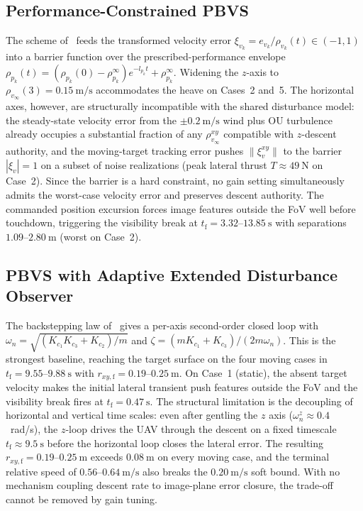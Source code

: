 \documentclass{IEEEtaes}
\begin{document}
\subsection{Performance-Constrained PBVS \cite{lin2022}}
The scheme of~\cite{lin2022} feeds the transformed velocity error $\xi_{v_k}=e_{v_k}/\rho_{v_k}(t)\in(-1,1)$ into a barrier function over the prescribed-performance envelope $\rho_{p_k}(t)=(\rho_{p_k}(0)-\rho_{p_k}^\infty)e^{-l_{p_k}t}+\rho_{p_k}^\infty$. Widening the $z$-axis to $\rho_{v_\infty}(3)=0.15~\text{m/s}$ accommodates the heave on Cases~2 and~5. The horizontal axes, however, are structurally incompatible with the shared disturbance model: the steady-state velocity error from the $\pm 0.2~\text{m/s}$ wind plus OU turbulence already occupies a substantial fraction of any $\rho_{v_\infty}^{xy}$ compatible with $z$-descent authority, and the moving-target tracking error pushes $\|\xi_v^{xy}\|$ to the barrier $|\xi_v|=1$ on a subset of noise realizations (peak lateral thrust $T\approx 49~\text{N}$ on Case~2). Since the barrier is a hard constraint, no gain setting simultaneously admits the worst-case velocity error and preserves descent authority. The commanded position excursion forces image features outside the FoV well before touchdown, triggering the visibility break at $t_\text{f}=3.32$--$13.85~\text{s}$ with separations $1.09$--$2.80~\text{m}$ (worst on Case~2).

\subsection{PBVS with Adaptive Extended Disturbance Observer \cite{zhang2026}}
The backstepping law of~\cite{zhang2026} gives a per-axis second-order closed loop with $\omega_n=\sqrt{(K_{c_1}K_{c_3}+K_{c_2})/m}$ and $\zeta=(mK_{c_1}+K_{c_3})/(2m\omega_n)$. This is the strongest baseline, reaching the target surface on the four moving cases in $t_\text{f}=9.55$--$9.88~\text{s}$ with $r_{xy,\text{f}}=0.19$--$0.25~\text{m}$. On Case~1 (static), the absent target velocity makes the initial lateral transient push features outside the FoV and the visibility break fires at $t_\text{f}=0.47~\text{s}$. The structural limitation is the decoupling of horizontal and vertical time scales: even after gentling the $z$ axis ($\omega_n^z\approx 0.4$~rad/s), the $z$-loop drives the UAV through the descent on a fixed timescale $t_\text{f}\approx 9.5~\text{s}$ before the horizontal loop closes the lateral error. The resulting $r_{xy,\text{f}}=0.19$--$0.25~\text{m}$ exceeds $0.08~\text{m}$ on every moving case, and the terminal relative speed of $0.56$--$0.64~\text{m/s}$ also breaks the $0.20~\text{m/s}$ soft bound. With no mechanism coupling descent rate to image-plane error closure, the trade-off cannot be removed by gain tuning.
\end{document}
